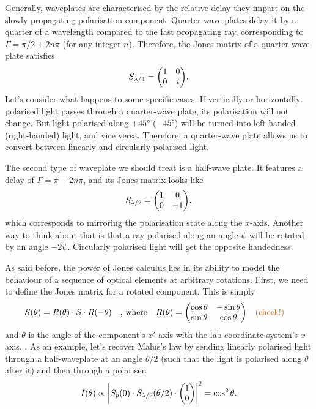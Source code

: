 Generally, waveplates are characterised by the relative delay they impart on the slowly propagating polarisation component. Quarter-wave plates delay it by a quarter of a wavelength compared to the fast propagating ray, corresponding to $ \Gamma = \pi/2 + 2n\pi $ (for any integer $ n $). Therefore, the Jones matrix of a quarter-wave plate satisfies 
\begin{equation}
	S_\qwp = \mqty(1 & 0 \\ 0 & i).
\end{equation}
Let's consider what happens to some specific cases. If vertically or horizontally polarised light passes through a quarter-wave plate, its polarisation will not change. But light polarised along $ +\ang{45} $ ($ -\ang{45} $) will be turned into left-handed (right-handed) light, and vice versa. Therefore, a quarter-wave plate allows us to convert between linearly and circularly polarised light. 

The second type of waveplate we should treat is a half-wave plate. It features a delay of $ \Gamma = \pi + 2n\pi $, and its Jones matrix looks like
\begin{equation}
	S_\hwp = \mqty(1 & 0 \\ 0 & -1),
\end{equation}
which corresponds to mirroring the polarisation state along the $ x $-axis. Another way to think about that is that a ray polarised along an angle $ \psi $ will be rotated by an angle $ -2\psi $. Circularly polarised light will get the opposite handedness.

As said before, the power of Jones calculus lies in its ability to model the behaviour of a sequence of optical elements at arbitrary rotations. First, we need to define the Jones matrix for a rotated component. This is simply
\begin{equation}
	S(\theta) = R(\theta) \cdot S \cdot R(-\theta) 
	\qq{, where} 
	R(\theta) = \mqty(\cos\theta & -\sin\theta \\ \sin\theta & \cos\theta) \qq{\todo{check!}}
\end{equation}
and $ \theta $ is the angle of the component's $ x' $-axis with the lab coordinate system's $ x $-axis. . As an example, let's recover Malus's law by sending linearly polarised light through a half-waveplate at an angle $ \theta/2 $ (such that the light is polarised along $ \theta $ after it) and then through a polariser.
\begin{equation}
	I(\theta) \propto \abs{S_p(0) \cdot S_\hwp(\theta/2) \cdot \mqty(\admat{1 \\ 0})}^2 = \cos^2\theta.
\end{equation}

